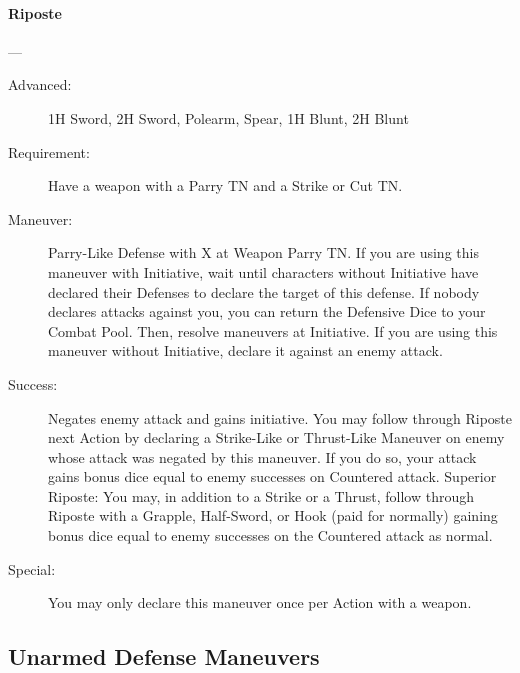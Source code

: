 \documentclass[oneside,11pt,english]{book}
\begin{document}
\paragraph{\large\label{man:Riposte} Riposte}---\quad{\large[2+X]}
\vspace{-10pt}\begin{description}
\item [Advanced:] 1H Sword, 2H Sword, Polearm, Spear, 1H Blunt, 2H Blunt %
\item [Requirement:] Have a weapon with a Parry TN and a Strike or Cut TN. 
\item [Maneuver:] Parry-Like Defense with X at Weapon Parry TN. 
If you are using this maneuver with Initiative, wait until characters without Initiative have declared their 
Defenses to declare the target of this defense. If nobody declares attacks against you, you can return the 
Defensive Dice to your Combat Pool. Then, resolve maneuvers at Initiative. 
If you are using this maneuver without Initiative, declare it against an enemy attack. 
\item [Success:] Negates enemy attack and gains initiative. You may follow through Riposte next Action by 
declaring a Strike-Like or Thrust-Like Maneuver on enemy whose attack was negated by this maneuver. 
If you do so, your attack gains bonus dice equal to enemy successes on Countered attack. 
Superior Riposte: You may, in addition to a Strike or a Thrust, follow through Riposte with a Grapple, 
Half-Sword, or Hook (paid for normally) gaining bonus dice equal to enemy successes on the Countered 
attack as normal. 
\item [Special:] You may only declare this maneuver once per Action with a weapon. 
\end{description}

\subsection{Unarmed Defense Maneuvers}
\end{document}
